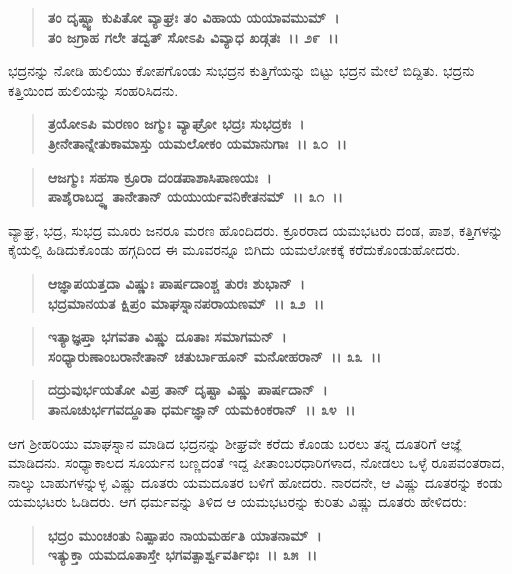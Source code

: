 \begin{verse}
\textbf{ತಂ ದೃಷ್ಟ್ವಾ ಕುಪಿತೋ ವ್ಯಾಘ್ರಃ ತಂ ವಿಹಾಯ ಯಯಾವಮುಮ್~।}\\\textbf{ತಂ ಜಗ್ರಾಹ ಗಲೇ ತದ್ವತ್ ಸೋಽಪಿ ವಿವ್ಯಾಧ ಖಡ್ಗತಃ~।। ೨೯~।।}
\end{verse}

ಭದ್ರನನ್ನು ನೋಡಿ ಹುಲಿಯು ಕೋಪಗೊಂಡು ಸುಭದ್ರನ ಕುತ್ತಿಗೆಯನ್ನು ಬಿಟ್ಟು ಭದ್ರನ ಮೇಲೆ ಬಿದ್ದಿತು. ಭದ್ರನು ಕತ್ತಿಯಿಂದ ಹುಲಿಯನ್ನು ಸಂಹರಿಸಿದನು.

\begin{verse}
\textbf{ತ್ರಯೋಽಪಿ ಮರಣಂ ಜಗ್ಮುಃ ವ್ಯಾಘ್ರೋ ಭದ್ರಃ ಸುಭದ್ರಕಃ~।}\\\textbf{ತ್ರೀನೇತಾನ್ನೇತುಕಾಮಾಸ್ತು ಯಮಲೋಕಂ ಯಮಾನುಗಾಃ~।। ೩೦~।।} 
\end{verse}

\begin{verse}
\textbf{ಆಜಗ್ಮುಃ ಸಹಸಾ ಕ್ರೂರಾ ದಂಡಪಾಶಾಸಿಪಾಣಯಃ~।}\\\textbf{ಪಾಶೈರಾಬದ್ಧ್ಯ ತಾನೇತಾನ್ ಯಯುರ್ಯವನಿಕೇತನಮ್~।। ೩೧~।।}
\end{verse}

ವ್ಯಾಘ್ರ, ಭದ್ರ, ಸುಭದ್ರ ಮೂರು ಜನರೂ ಮರಣ ಹೊಂದಿದರು. ಕ್ರೂರರಾದ ಯಮಭಟರು ದಂಡ, ಪಾಶ, ಕತ್ತಿಗಳನ್ನು ಕೈಯಲ್ಲಿ ಹಿಡಿದುಕೊಂಡು ಹಗ್ಗದಿಂದ ಈ ಮೂವರನ್ನೂ ಬಿಗಿದು ಯಮಲೋಕಕ್ಕೆ ಕರೆದುಕೊಂಡುಹೋದರು.

\begin{verse}
\textbf{ಆಜ್ಞಾಪಯತ್ತದಾ ವಿಷ್ಣುಃ ಪಾರ್ಷದಾಂಶ್ಚ ತುರಃ ಶುಭಾನ್~।}\\\textbf{ಭದ್ರಮಾನಯತ ಕ್ಷಿಪ್ರಂ ಮಾಘಸ್ನಾನಪರಾಯಣಮ್~।। ೩೨~।।} 
\end{verse}

\begin{verse}
\textbf{ಇತ್ಯಾಜ್ಞಪ್ತಾ ಭಗವತಾ ವಿಷ್ಣು ದೂತಾಃ ಸಮಾಗಮನ್~।}\\\textbf{ಸಂಧ್ಯಾರುಣಾಂಬರಾನೇತಾನ್ ಚತುರ್ಬಾಹೂನ್ ಮನೋಹರಾನ್~।। ೩೩~।। }
\end{verse}

\begin{verse}
\textbf{ದದ್ರುವುರ್ಭಯತೋ ವಿಪ್ರ ತಾನ್ ದೃಷ್ಟಾ ವಿಷ್ಣು ಪಾರ್ಷದಾನ್~।}\\\textbf{ತಾನೂಚುರ್ಭಗವದ್ದೂತಾ ಧರ್ಮಜ್ಞಾನ್ ಯಮಕಿಂಕರಾನ್~।। ೩೪~।।}
\end{verse}

ಆಗ ಶ‍್ರೀಹರಿಯು ಮಾಘಸ್ನಾನ ಮಾಡಿದ ಭದ್ರನನ್ನು ಶೀಘ್ರವೇ ಕರೆದು ಕೊಂಡು ಬರಲು ತನ್ನ ದೂತರಿಗೆ ಆಜ್ಞೆ ಮಾಡಿದನು. ಸಂಧ್ಯಾಕಾಲದ ಸೂರ್ಯನ ಬಣ್ಣದಂತೆ ಇದ್ದ ಪೀತಾಂಬರಧಾರಿಗಳಾದ, ನೋಡಲು ಒಳ್ಳೆ ರೂಪವಂತರಾದ, ನಾಲ್ಕು ಬಾಹುಗಳನ್ನುಳ್ಳ ವಿಷ್ಣು ದೂತರು ಯಮದೂತರ ಬಳಿಗೆ ಹೋದರು. ನಾರದನೇ, ಆ ವಿಷ್ಣು ದೂತರನ್ನು ಕಂಡು ಯಮಭಟರು ಓಡಿದರು. ಆಗ ಧರ್ಮವನ್ನು ತಿಳಿದ ಆ ಯಮಭಟರನ್ನು ಕುರಿತು ವಿಷ್ಣು ದೂತರು ಹೇಳಿದರು:

\begin{verse}
\textbf{ಭದ್ರಂ ಮುಂಚಂತು ನಿಷ್ಪಾಪಂ ನಾಯಮರ್ಹತಿ ಯಾತನಾಮ್~।}\\\textbf{ಇತ್ಯುಕ್ತಾ ಯಮದೂತಾಸ್ತೇ ಭಗವತ್ಪಾರ್ಶ್ವವರ್ತಿಭಿಃ~।। ೩೫~।।}
\end{verse}


